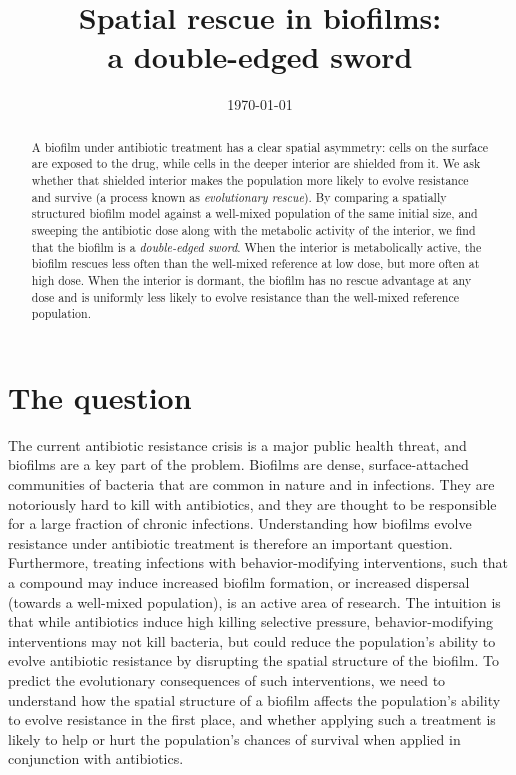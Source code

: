 \documentclass[11pt]{article}
\title{Spatial rescue in biofilms:\\
a double-edged sword}
\author{}
\date{\today}
\begin{document}
\maketitle

\begin{abstract}
\noindent A biofilm under antibiotic treatment has a clear spatial
asymmetry: cells on the surface are exposed to the drug, while cells
in the deeper interior are shielded from it. We ask whether that
shielded interior makes the population more likely to evolve
resistance and survive (a process known as \emph{evolutionary rescue}). By comparing a spatially structured biofilm model
against a well-mixed population of the same initial size, and
sweeping the antibiotic dose along with the metabolic activity of
the interior, we find that the biofilm is a \emph{double-edged
sword}. When the interior is metabolically active, the biofilm
rescues less often than the well-mixed reference at low dose, but
more often at high dose. When the interior is dormant, the biofilm
has no rescue advantage at any dose and is uniformly less likely to evolve resistance than the well-mixed reference population.
\end{abstract}

\section{The question}

The current antibiotic resistance crisis is a major public health threat, and biofilms are a key part of the problem. Biofilms are dense, surface-attached communities of bacteria that are common in nature and in infections. They are notoriously hard to kill with antibiotics, and they are thought to be responsible for a large fraction of chronic infections. Understanding how biofilms evolve resistance under antibiotic treatment is therefore an important question. Furthermore, treating infections with behavior-modifying interventions, such that a compound may induce increased biofilm formation, or increased dispersal (towards a well-mixed population), is an active area of research. The intuition is that while antibiotics induce high killing selective pressure, behavior-modifying interventions may not kill bacteria, but could reduce the population's ability to evolve antibiotic resistance by disrupting the spatial structure of the biofilm. To predict the evolutionary consequences of such interventions, we need to understand how the spatial structure of a biofilm affects the population's ability to evolve resistance in the first place, and whether applying such a treatment is likely to help or hurt the population's chances of survival when applied in conjunction with antibiotics. 
\end{document}

